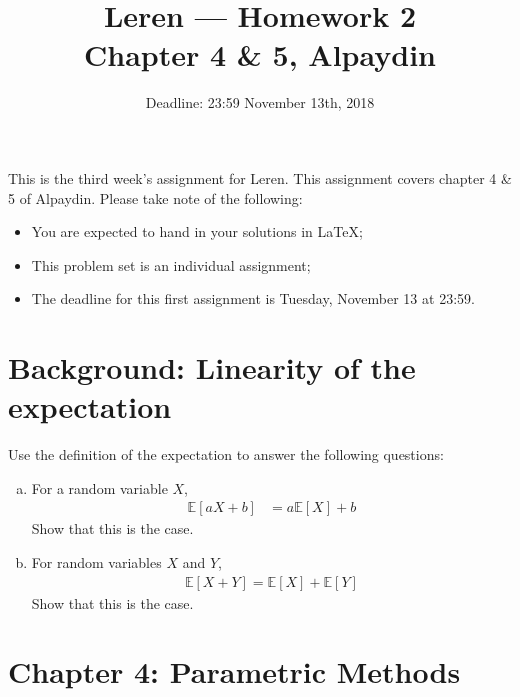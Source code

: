 \documentclass[11pt,a4paper]{article}
\title{Leren --- Homework 2\\[3mm]\small{Chapter 4 \& 5, Alpaydin}}
\date{Deadline: 23:59 November 13th, 2018}
\begin{document}
\maketitle

\newcommand{\LL}{\mathcal{L}(\bmu, \bSigma|\mathcal{\bX})}
\newcommand{\LLp}{\mathcal{L}(\textbf{p}|\mathcal{\bX})}

\newcommand{\dermuLL}{\frac{\partial\mathcal{L}(\bmu, \bSigma|\mathcal{\bX})}{\partial \bmu}}
\newcommand{\dersigmaLL}{\frac{\partial \mathcal{L}(\mu, \sigma|\mathcal{X})}{\partial \sigma^2}}
\newcommand{\derpLLp}{\frac{\partial\LLp}{\partial p_k}}

This is the third week's assignment for Leren.  This assignment covers
chapter 4 \& 5 of Alpaydin. Please take note of the following:

\begin{itemize}
  \item You are expected to hand in your solutions in \LaTeX;
  \item This problem set is an individual assignment;
  \item The deadline for this first assignment is Tuesday, November 13 at 23:59.
\end{itemize}


\section{Background: Linearity of the expectation}
Use the definition of the expectation to answer the following
questions:
\begin{enumerate}[(a)]
	\item For a random variable $X$,
		\begin{align}
			\mathds{E}[a X + b] &= a \mathds{E}[X] + b
		\end{align}
		Show that this is the case.
	\item For random variables $X$ and $Y$,
		\begin{align}
			\mathds{E}[X + Y] = \mathds{E}[X] + \mathds{E}[Y]
		\end{align}
		Show that this is the case.
\end{enumerate}

\section{Chapter 4: Parametric Methods}
\end{document}
